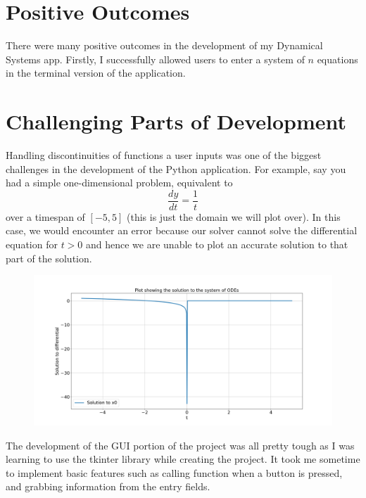 \documentclass[12pt]{report}
\begin{document}
\section{Positive Outcomes}
There were many positive outcomes in the development of my Dynamical Systems app. Firstly, I successfully allowed users to enter a system of $n$ equations in the terminal version of the application.
\section{Challenging Parts of Development}
Handling discontinuities of functions a user inputs was one of the biggest challenges in the development of the Python application. For example, say you had a simple one-dimensional problem, equivalent to
\begin{equation*}
    \frac{dy}{dt} = \frac{1}{t} 
\end{equation*}
over a timespan of $[-5,5]$ (this is just the domain we will plot over). In this case, we would encounter an error because our solver cannot solve the differential equation for $t > 0$ and hence we are unable to plot an accurate solution to that part of the solution.
\begin{figure}[H]
    \centering
    \includegraphics[scale = 0.35]{Demo 5.png}
\end{figure}
The development of the GUI portion of the project was all pretty tough as I was learning to use the tkinter library while creating the project. It took me sometime to implement basic features such as calling function when a button is pressed, and grabbing information from the entry fields.
\end{document}
